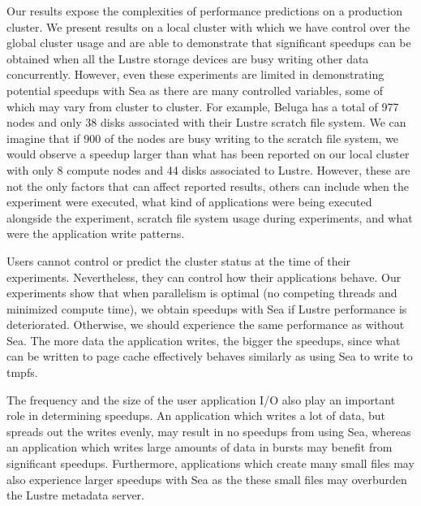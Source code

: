     Our results expose the complexities of performance predictions on a
    production cluster. We present results on a local cluster with which we have
    control over the global cluster usage and are able to demonstrate that
    significant speedups can be obtained when all the Lustre storage devices
    are busy writing other data concurrently. However, even these experiments
    are limited in demonstrating potential speedups with Sea as there are many
    controlled variables, some of which may vary from cluster to cluster. For
    example, Beluga has a total of 977 nodes and only 38 disks associated with
    their Lustre scratch file system. We can imagine that if 900 of the nodes
    are busy writing to the scratch file system, we would observe a speedup
    larger than what has been reported on our local cluster with only 8 compute
    nodes and 44 disks associated to Lustre. However, these are not the only
    factors that can affect reported results, others can include when the
    experiment were executed, what kind of applications were being executed
    alongside the experiment, scratch file system usage during experiments, and what
    were the application write patterns.

    Users cannot control or predict the cluster status at the time of
    their experiments. Nevertheless, they can control how their applications behave. Our
    experiments show that when parallelism is optimal (no competing threads and
    minimized compute time), we obtain speedups with Sea if Lustre performance
    is deteriorated. Otherwise, we should experience the same performance as 
    without Sea. The more data the application writes, the bigger the speedups, since what
    can be written to page cache effectively behaves similarly as using Sea to write
    to tmpfs.
    
    The frequency and the size of the user application I/O also
    play an important role in determining speedups. An application which writes
    a lot of data, but spreads out the writes evenly, may result in no
    speedups from using Sea, whereas an application which writes large amounts
    of data in bursts may benefit from significant speedups. Furthermore,
    applications which create many small files may also experience larger
    speedups with Sea as the these small files may overburden the Lustre
    metadata server.

    
